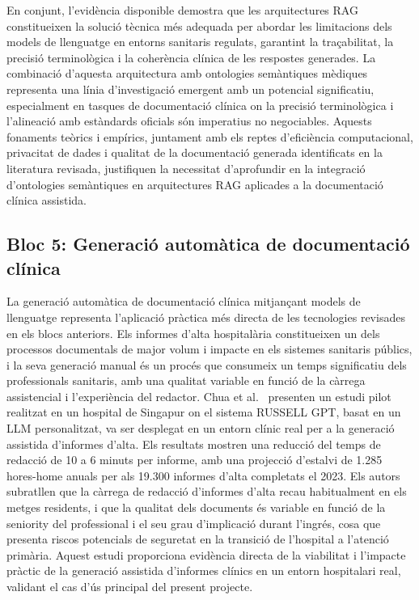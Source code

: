 \documentclass[11pt,a4paper]{article}
\begin{document}
En conjunt, l'evidència disponible demostra que les arquitectures RAG constitueixen la solució tècnica més adequada per abordar les limitacions dels models de llenguatge en entorns sanitaris regulats, garantint la traçabilitat, la precisió terminològica i la coherència clínica de les respostes generades. La combinació d'aquesta arquitectura amb ontologies semàntiques mèdiques representa una línia d'investigació emergent amb un potencial significatiu, especialment en tasques de documentació clínica on la precisió terminològica i l'alineació amb estàndards oficials són imperatius no negociables. Aquests fonaments teòrics i empírics, juntament amb els reptes d'eficiència computacional, privacitat de dades i qualitat de la documentació generada identificats en la literatura revisada, justifiquen la necessitat d'aprofundir en la integració d'ontologies semàntiques en arquitectures RAG aplicades a la documentació clínica assistida.

\subsection*{Bloc 5: Generació automàtica de documentació clínica}

La generació automàtica de documentació clínica mitjançant models de llenguatge representa l'aplicació pràctica més directa de les tecnologies revisades en els blocs anteriors. Els informes d'alta hospitalària constitueixen un dels processos documentals de major volum i impacte en els sistemes sanitaris públics, i la seva generació manual és un procés que consumeix un temps significatiu dels professionals sanitaris, amb una qualitat variable en funció de la càrrega assistencial i l'experiència del redactor. Chua et al.~\cite{chua2024discharge} presenten un estudi pilot realitzat en un hospital de Singapur on el sistema RUSSELL GPT, basat en un LLM personalitzat, va ser desplegat en un entorn clínic real per a la generació assistida d'informes d'alta. Els resultats mostren una reducció del temps de redacció de 10 a 6 minuts per informe, amb una projecció d'estalvi de 1.285 hores-home anuals per als 19.300 informes d'alta completats el 2023. Els autors subratllen que la càrrega de redacció d'informes d'alta recau habitualment en els metges residents, i que la qualitat dels documents és variable en funció de la seniority del professional i el seu grau d'implicació durant l'ingrés, cosa que presenta riscos potencials de seguretat en la transició de l'hospital a l'atenció primària. Aquest estudi proporciona evidència directa de la viabilitat i l'impacte pràctic de la generació assistida d'informes clínics en un entorn hospitalari real, validant el cas d'ús principal del present projecte.
\end{document}

